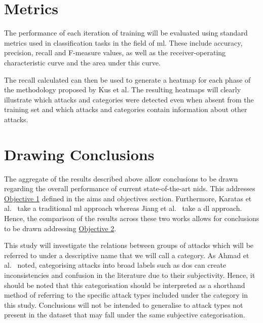 \section{Metrics}%
\label{sec:metrics}

The performance of each iteration of training will be evaluated using standard
metrics used in classification tasks in the field of \gls{ml}. These include
accuracy, precision, recall and F-measure values, as well as the
receiver-operating characteristic curve and the area under this
curve.~\cite{metrics}

The recall calculated can then be used to generate a heatmap for each phase of
the methodology proposed by Kus et al. The resulting heatmaps will clearly
illustrate which attacks and categories were detected even when absent from the
training set and which attacks and categories contain information about other
attacks.

\section{Drawing Conclusions}%
\label{sec:conclusions}

The aggregate of the results described above allow conclusions to be drawn
regarding the overall performance of current state-of-the-art \gls{nids}. This
addresses \hyperlink{obj}{Objective 1} defined in the aims and objectives
section. Furthermore, Karatas et al.~\cite{Karatas} take a traditional \gls{ml}
approach whereas Jiang et al.~\cite{Jiang} take a \gls{dl} approach. Hence, the
comparison of the results across these two works allows for conclusions to be
drawn addressing \hyperlink{obj}{Objective 2}.

This study will investigate the relations between groups of attacks which will
be referred to under a descriptive name that we will call a category. As Ahmad
et al.~\cite{zero-day} noted, categorising attacks into broad labels such as
\gls{dos} can create inconsistencies and confusion in the literature due to
their subjectivity. Hence, it should be noted that this categorisation should
be interpreted as a shorthand method of referring to the specific attack types
included under the category in this study. Conclusions will not be intended to
generalise to attack types not present in the dataset that may fall under the
same subjective categorisation.
